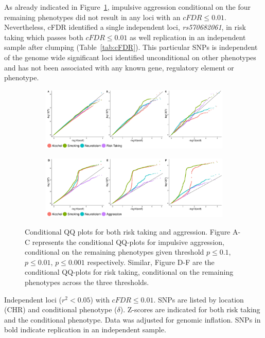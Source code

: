 As already indicated in Figure~\ref{fig:cFDR}, impulsive aggression conditional on the four remaining phenotypes did not result in any loci with an $cFDR\leq0.01$.
Nevertheless, cFDR identified a single independent loci, \textit{rs570682061}, in risk taking which passes both $cFDR\leq0.01$ as well replication in an independent sample after clumping (Table~\ref{tab:cFDR}).
This particular SNPs is independent of the genome wide significant loci identified unconditional on other phenotypes and has not been associated with any known gene, regulatory element or phenotype.

\begin{figure}[!htpb]
  \centering
	\begin{subfigure}{1\textwidth}
		\centering
    \includegraphics[width=1\linewidth]{ukb_assoc/figure/cFDR/agg_cond.jpeg}
	\end{subfigure}
	\begin{subfigure}{1\textwidth}
		\centering
    \includegraphics[width=1\linewidth]{ukb_assoc/figure/cFDR/risk_cond.jpeg}
	\end{subfigure}
  \caption{
    Conditional QQ plots for both risk taking and aggression. 
    Figure A-C represents the conditional QQ-plots for impulsive aggression,
    conditional on the remaining phenotypes given threshold $p\leq0.1$, $p\leq0.01$, $p\leq0.001$ respectively.
    Similar, Figure D-F are the conditional QQ-plots for risk taking, conditional on the remaining phenotypes across the three thresholds.\label{fig:cFDR}}
\end{figure}


\begin{table}[htpb]
  
  \caption{
    Independent loci ($r^2 < 0.05$) with $cFDR\leq0.01$.
    SNPs are listed by location (CHR) and conditional phenotype ($\delta$).
    Z-scores are indicated for both risk taking and the conditional phenotype.
    Data was adjusted for genomic inflation.
    SNPs in bold indicate replication in an independent sample.
  }\label{tab:cFDR}
\end{table}

